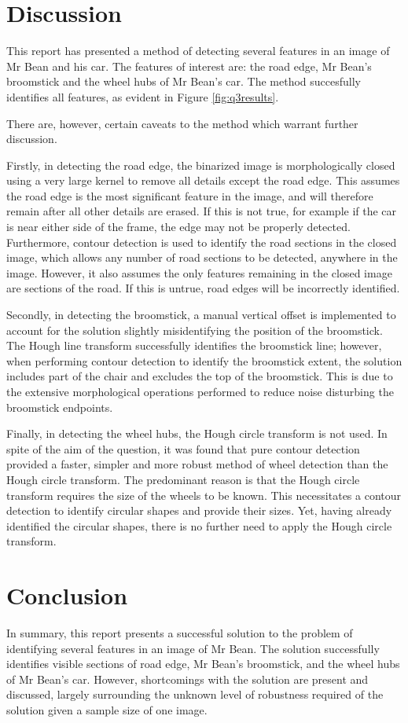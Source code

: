 \newpage
\section{Discussion}

This report has presented a method of detecting several features in an image of Mr Bean and his car. The features of interest are: the road edge, Mr Bean's broomstick and the wheel hubs of Mr Bean's car. The method succesfully identifies all features, as evident in Figure \ref{fig:q3results}.

There are, however, certain caveats to the method which warrant further discussion.

Firstly, in detecting the road edge, the binarized image is morphologically closed using a very large kernel to remove all details except the road edge. This assumes the road edge is the most significant feature in the image, and will therefore remain after all other details are erased. If this is not true, for example if the car is near either side of the frame, the edge may not be properly detected. Furthermore, contour detection is used to identify the road sections in the closed image, which allows any number of road sections to be detected, anywhere in the image. However, it also assumes the only features remaining in the closed image are sections of the road. If this is untrue, road edges will be incorrectly identified.

Secondly, in detecting the broomstick, a manual vertical offset is implemented to account for the solution slightly misidentifying the position of the broomstick. The Hough line transform successfully identifies the broomstick line; however, when performing contour detection to identify the broomstick extent, the solution includes part of the chair and excludes the top of the broomstick. This is due to the extensive morphological operations performed to reduce noise disturbing the broomstick endpoints.

Finally, in detecting the wheel hubs, the Hough circle transform is not used. In spite of the aim of the question, it was found that pure contour detection provided a faster, simpler and more robust method of wheel detection than the Hough circle transform. The predominant reason is that the Hough circle transform requires the size of the wheels to be known. This necessitates a contour detection to identify circular shapes and provide their sizes. Yet, having already identified the circular shapes, there is no further need to apply the Hough circle transform.

\section{Conclusion}

In summary, this report presents a successful solution to the problem of identifying several features in an image of Mr Bean. The solution successfully identifies visible sections of road edge, Mr Bean's broomstick, and the wheel hubs of Mr Bean's car. However, shortcomings with the solution are present and discussed, largely surrounding the unknown level of robustness required of the solution given a sample size of one image.
